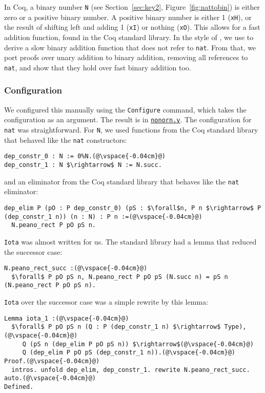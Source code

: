 In Coq, a binary number \lstinline{N} (see Section~\ref{sec:key2}, Figure~\ref{fig:nattobin}) is either zero or a positive binary number. A positive binary number
is either 1 (\lstinline{xH}), or the result of shifting left and adding 1 (\lstinline{xI})
or nothing (\lstinline{xO}).
This allows for a fast addition function, found in the Coq standard library.
In the style of \citet{magaud2000changing}, we use \toolname to derive a slow binary
addition function that does not refer to \lstinline{nat}.
From that, we port proofs over unary addition to binary addition,
removing all references to \lstinline{nat}, and show that they hold over fast binary addition too.

\subsubsection{Configuration}
We configured this manually using the \lstinline{Configure} command,
which takes the configuration as an argument.
The result is in \href{https://github.com/uwplse/pumpkin-pi/blob/master/plugin/coq/nonorn.v}{\lstinline{nonorn.v}}.
The configuration for \lstinline{nat} was straightforward.
For \lstinline{N}, we used functions from the Coq standard library that
behaved like the \lstinline{nat} constructors:

\begin{lstlisting}
dep_constr_0 : N := 0%N.(@\vspace{-0.04cm}@)
dep_constr_1 : N $\rightarrow$ N := N.succ.
\end{lstlisting}
and an eliminator from the Coq standard library that behaves like the \lstinline{nat} eliminator:

\begin{lstlisting}
dep_elim P (pO : P dep_constr_0) (pS : $\forall$n, P n $\rightarrow$ P (dep_constr_1 n)) (n : N) : P n :=(@\vspace{-0.04cm}@)
  N.peano_rect P pO pS n.
\end{lstlisting}
\lstinline{Iota} was almost written for us.
The standard library had a lemma that reduced the successor case:

\begin{lstlisting}
N.peano_rect_succ :(@\vspace{-0.04cm}@)
  $\forall$ P pO pS n, N.peano_rect P pO pS (N.succ n) = pS n (N.peano_rect P pO pS n).
\end{lstlisting}
\lstinline{Iota} over the successor case was a simple rewrite by this lemma:

\begin{lstlisting}
Lemma iota_1 :(@\vspace{-0.04cm}@)
  $\forall$ P pO pS n (Q : P (dep_constr_1 n) $\rightarrow$ Type),(@\vspace{-0.04cm}@)
     Q (pS n (dep_elim P pO pS n)) $\rightarrow$(@\vspace{-0.04cm}@)
     Q (dep_elim P pO pS (dep_constr_1 n)).(@\vspace{-0.04cm}@)
Proof.(@\vspace{-0.04cm}@)
  intros. unfold dep_elim, dep_constr_1. rewrite N.peano_rect_succ. auto.(@\vspace{-0.04cm}@)
Defined.
\end{lstlisting}

